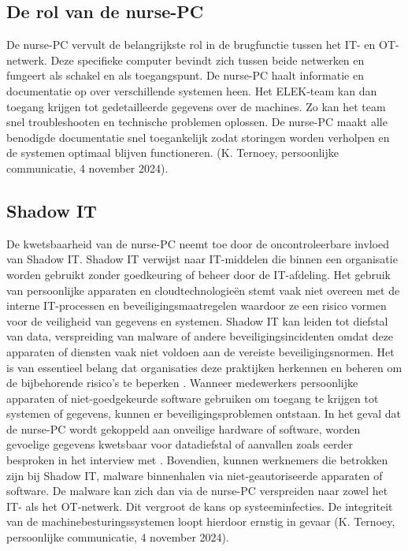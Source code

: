 \subsection{De rol van de nurse-PC} 
De nurse-PC vervult de belangrijkste rol in de brugfunctie tussen het IT- en OT-netwerk. Deze specifieke computer bevindt 
zich tussen beide netwerken en fungeert als schakel en als toegangspunt. De nurse-PC haalt informatie en documentatie op over verschillende systemen heen.
Het ELEK-team kan dan toegang krijgen tot gedetailleerde gegevens over de machines. 
Zo kan het team snel troubleshooten en technische problemen oplossen. 
De nurse-PC maakt alle benodigde documentatie snel toegankelijk zodat storingen worden verholpen en de systemen optimaal blijven functioneren. (K. Ternoey, persoonlijke communicatie, 4 november 2024).

\subsection{Shadow IT}
De kwetsbaarheid van de nurse-PC neemt toe door de oncontroleerbare invloed van Shadow IT.
Shadow IT verwijst naar IT-middelen die binnen een organisatie worden gebruikt zonder goedkeuring of beheer door de IT-afdeling.
Het gebruik van persoonlijke apparaten en cloudtechnologieën stemt vaak niet overeen met de interne IT-processen en beveiligingsmaatregelen waardoor ze een 
risico vormen voor de veiligheid van gegevens en systemen. Shadow IT kan leiden tot diefstal van data, 
verspreiding van malware of andere beveiligingsincidenten omdat deze apparaten of diensten vaak niet voldoen aan de vereiste beveiligingsnormen. 
Het is van essentieel belang dat organisaties deze praktijken herkennen en beheren om de bijbehorende risico’s te beperken \autocite{NCSC2023}.
Wanneer medewerkers persoonlijke apparaten of niet-goedgekeurde software gebruiken om toegang te krijgen tot systemen of gegevens, kunnen er beveiligingsproblemen 
ontstaan. In het geval dat de nurse-PC wordt gekoppeld aan onveilige hardware of software, worden gevoelige gegevens kwetsbaar voor 
datadiefstal of aanvallen zoals eerder besproken in het interview met \textcite{Hecker2021}.
Bovendien, kunnen werknemers die betrokken zijn bij Shadow IT, malware binnenhalen via niet-geautoriseerde apparaten of software. 
De malware kan zich dan via de nurse-PC verspreiden naar zowel het IT- als het OT-netwerk. 
Dit vergroot de kans op systeeminfecties. De integriteit van de machinebesturingssystemen loopt hierdoor ernstig in
gevaar (K. Ternoey, persoonlijke communicatie, 4 november 2024).


